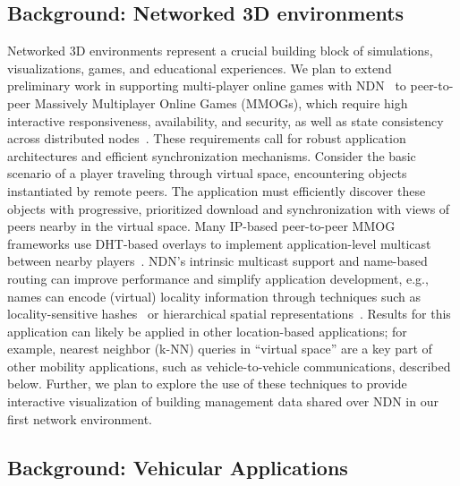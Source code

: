 \subsection{Background: Networked 3D environments} 
Networked 3D environments represent a crucial building block of simulations,
visualizations, games, and educational experiences.  We plan to extend
preliminary work in supporting multi-player online games with NDN~\cite{GamingTR}
to peer-to-peer Massively Multiplayer Online Games (MMOGs), which require
high interactive responsiveness, availability, and security,
as well as state consistency across distributed nodes~\cite{schiele2007requirements}. 
These requirements call for
robust application architectures and efficient synchronization mechanisms. 
Consider the basic scenario of a player traveling through
virtual space, encountering objects instantiated by remote peers.
The application must efficiently discover these objects with progressive, 
prioritized download and synchronization with views of peers nearby in the
virtual space. Many IP-based peer-to-peer MMOG frameworks
use DHT-based overlays to implement application-level multicast between
nearby players~\cite{carter2012survey}.  NDN's intrinsic multicast support 
and name-based routing can improve performance and simplify application 
development, e.g., names can encode (virtual) locality information through techniques 
such as locality-sensitive hashes~\cite{datar2004locality} or hierarchical spatial
representations~\cite{samet1984quadtree}. Results for this application can likely be applied in other location-based applications; for example, nearest neighbor (k-NN) queries in ``virtual space'' are a key part of other mobility applications, such as vehicle-to-vehicle communications, described below.  Further, we plan to explore the use of these techniques to provide interactive visualization of building management data shared over NDN in our first network environment. 

\subsection{Background: Vehicular Applications} 

